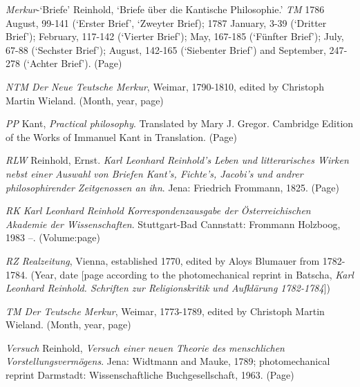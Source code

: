 \textit{Merkur}{-}`Briefe' Reinhold, `Briefe \"{u}ber die Kantische Philosophie.' \textit{TM} 1786 August, 99{-}141 (`Erster Brief', `Zweyter Brief); 1787 January, 3{-}39 (`Dritter Brief'); February, 117{-}142 (`Vierter Brief'); May, 167{-}185 (`F\"{u}nfter Brief'); July, 67{-}88 (`Sechster Brief'); August, 142{-}165 (`Siebenter Brief') and September, 247{-}278 (`Achter Brief'). (Page)

\textit{NTM Der Neue Teutsche Merkur}, Weimar, 1790{-}1810, edited by Christoph Martin Wieland. (Month, year, page)

\textit{PP }Kant, \textit{Practical philosophy}. Translated by Mary J. Gregor. Cambridge Edition of the Works of Immanuel Kant in Translation. (Page)

\textit{RLW} Reinhold, Ernst. \textit{Karl Leonhard Reinhold's Leben und litterarisches Wirken nebst einer Auswahl von Briefen Kant's, Fichte's, Jacobi's und andrer philosophirender Zeitgenossen an ihn}. Jena: Friedrich Frommann, 1825. (Page)

\textit{RK} \textit{Karl Leonhard Reinhold Korrespondenzausgabe der \"{O}sterreichischen Akademie der Wissenschaften}. Stuttgart{-}Bad Cannstatt: Frommann Holzboog, 1983 {--}. (Volume:page)

\textit{RZ Realzeitung}, Vienna, established 1770, edited by Aloys Blumauer from 1782{-}1784. (Year, date [page according to the photomechanical reprint in Batscha, \textit{Karl Leonhard Reinhold. Schriften zur Religionskritik und Aufkl\"{a}rung 1782{-}1784}])

\textit{TM Der Teutsche Merkur}, Weimar, 1773{-}1789, edited by Christoph Martin Wieland. (Month, year, page) 

\textit{Versuch} Reinhold, \textit{Versuch einer neuen Theorie des menschlichen Vorstellungsverm\"{o}gens}. Jena: Widtmann and Mauke, 1789; photomechanical reprint Darmstadt: Wissenschaftliche Buchgesellschaft, 1963. (Page)

